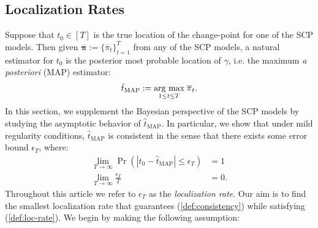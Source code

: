 \subsection{Localization Rates}
\label{sec:localization}

Suppose that $t_0 \in [T]$ is the true location of the change-point for one of the SCP models. Then given $\overline{\pmb{\pi}} := \{\overline{\pi}_t\}_{t=1}^T$ from any of the SCP models, a natural estimator for $t_0$ is the posterior most probable location of $\gamma$, i.e. the maximum \textit{a posteriori} (MAP) estimator:
\begin{align}\label{eq:map}
    \hat{t}_{\text{MAP}} := \underset{1 \leq t \leq T}{\text{arg max}} \; \overline{\pi}_t.
\end{align}
In this section, we supplement the Bayesian perspective of the SCP models by studying the asymptotic behavior of $\hat{t}_{\text{MAP}}$. In particular, we show that under mild regularity conditions, $\hat{t}_{\text{MAP}}$ is consistent in the sense that there exists some error bound $\epsilon_T$, where:
\begin{align}
    \lim_{T\to\infty} \Pr\left(|t_0 - \hat{t}_{\text{MAP}}| \leq \epsilon_T\right) &= 1 \label{def:consistency} \\
    \lim_{T\to\infty} \frac{\epsilon_T}{T} &= 0. \label{def:loc-rate}
\end{align}
Throughout this article we refer to $\epsilon_T$ as the \textit{localization rate}. Our aim is to find the smallest localization rate that guarantees (\ref{def:consistency}) while satisfying (\ref{def:loc-rate}). We begin by making the following assumption:
